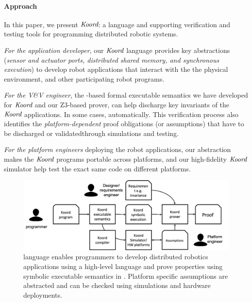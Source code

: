 \paragraph{Approach} In this paper, we present $\emph{Koord}$: a language and supporting verification and testing tools for programming distributed robotic systems. 
\begin{noinditem}
\item {\em For the application developer}, our $\emph{Koord}$ language provides key abstractions (\emph{sensor and actuator ports, distributed shared memory, and synchronous execution}) to develop robot applications that interact with the the physical environment, and other participating robot programs.
\item {\em For the V\&V engineer}, the \K-based formal executable semantics we have developed for $\emph{Koord}$ and our Z3-based prover, can help discharge key invariants of the $\emph{Koord}$ applications.  In some cases,  automatically. This verification process also identifies the {\em platform-dependent\/} proof obligations (or assumptions) that have to be discharged or validatedthrough simulations and testing. 
\item {\em For the platform engineers\/} deploying the robot applications, our abstraction makes the $\emph{Koord}$ programs portable across platforms, and our high-fidelity $\emph{Koord}$ simulator help test the exact same code on different platforms.
\end{noinditem}

\begin{figure}[h!]
\includegraphics[width=\linewidth]{figs/koorduser.png}
\caption{\small \lgname language  enables programmers to develop distributed robotics applications using a high-level language and prove properties using symbolic executable semantics in \K. Platform specific assumptions are abstracted and can be checked using simulations and hardware deployments.}
\label{fig:koorduser}
	\vspace{-5mm}
\end{figure}

